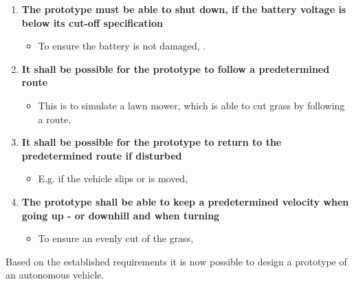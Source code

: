 \begin{enumerate}
\item \textbf{The prototype must be able to shut down, if the battery voltage is below its cut-off specification}
	\begin{itemize}
	\item[] To ensure the battery is not damaged, .
	\end{itemize}
\item \textbf{It shall be possible for the prototype to follow a predetermined route}
	\begin{itemize}
	\item[] This is to simulate a lawn mower, which is able to cut grass by following a route, 
	\end{itemize}
\item \textbf{It shall be possible for the prototype to return to the predetermined route if disturbed}
	\begin{itemize}
	\item[] E.g. if the vehicle slips or is moved, 
	\end{itemize}
\item \textbf{The prototype shall be able to keep a predetermined velocity when going up - or downhill and when turning}
	\begin{itemize}
	\item[] To ensure an evenly cut of the grass, 
	\end{itemize}
\end{enumerate}

Based on the established requirements it is now possible to design a prototype of an autonomous vehicle.
